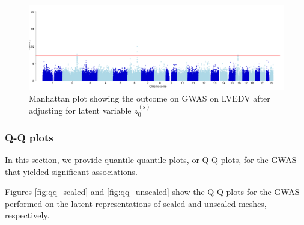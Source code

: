 \documentclass[fleqn,10pt]{wlscirep}
\begin{document}
\begin{figure}[ht!]
\includegraphics[width=\textwidth]{figs/supplementary/GWAS__LVEDV__std_covariates_adj_by_z5__GBR_ALL__qc__manhattan}
\caption{Manhattan plot showing the outcome on GWAS on LVEDV after adjusting for latent variable $z_0^{(\text{s})}$}
\label{fig:LVEDV_adj_by_z5}
\end{figure}


\subsubsection{Q-Q plots}
In this section, we provide quantile-quantile plots, or Q-Q plots, for the GWAS that yielded significant associations. %


Figures \ref{fig:qq_scaled} and \ref{fig:qq_unscaled} show the Q-Q plots for the GWAS performed on the latent representations of scaled and unscaled meshes, respectively.
\end{document}
